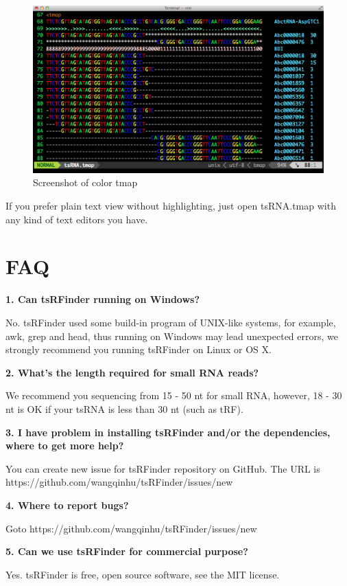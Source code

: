 \documentclass[11pt, a4paper]{article}
\begin{document}
\begin{figure}[htbp]
\begin{center}
\includegraphics[width=12cm]{tmap.png}
\caption{Screenshot of color tmap} 
\label{tmap}
\end{center}
\end{figure}

If you prefer plain text view without highlighting, just open tsRNA.tmap with any kind of text editors you have.

\section{FAQ}

\textbf{1. Can tsRFinder running on Windows?}

No. tsRFinder used some build-in program of UNIX-like systems, for example, awk, grep and head, thus running on Windows may lead unexpected errors, we strongly recommend you running tsRFinder on Linux or OS X.

\textbf{2. What's the length required for small RNA reads?}

We recommend you sequencing from 15 - 50 nt for small RNA, however, 18 - 30 nt is OK if your tsRNA is less than 30 nt (such as tRF).

\textbf{3. I have problem in installing tsRFinder and/or the dependencies, where to get more help?}

You can create new issue for tsRFinder repository on GitHub. The URL is https://github.com/wangqinhu/tsRFinder/issues/new

\textbf{4. Where to report bugs?}

Goto https://github.com/wangqinhu/tsRFinder/issues/new

\textbf{5. Can we use tsRFinder for commercial purpose?}

Yes. tsRFinder is free, open source software, see the MIT license.
\end{document}
